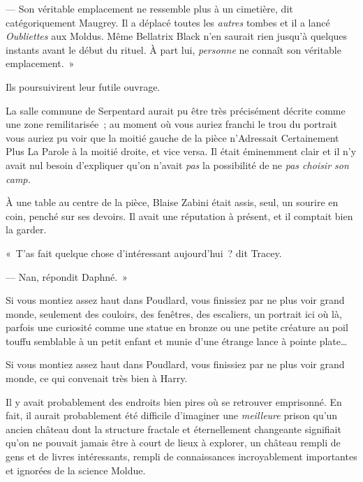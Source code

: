 --- Son véritable emplacement ne ressemble plus à un cimetière, dit catégoriquement Maugrey. Il a déplacé toutes les \emph{autres} tombes et il a lancé \emph{Oubliettes} aux Moldus. Même Bellatrix Black n'en saurait rien jusqu'à quelques instants avant le début du rituel. À part lui, \emph{personne} ne connaît son véritable emplacement.~»

Ils poursuivirent leur futile ouvrage.


La salle commune de Serpentard aurait pu être très précisément décrite comme une zone remilitarisée~; au moment où vous auriez franchi le trou du portrait vous auriez pu voir que la moitié gauche de la pièce n'Adressait Certainement Plus La Parole à la moitié droite, et vice versa. Il était éminemment clair et il n'y avait nul besoin d'expliquer qu'on n'avait \emph{pas} la possibilité de ne \emph{pas choisir son camp.}

À une table au centre de la pièce, Blaise Zabini était assis, seul, un sourire en coin, penché sur ses devoirs. Il avait une réputation à présent, et il comptait bien la garder.




«~T'as fait quelque chose d'intéressant aujourd'hui~? dit Tracey.

--- Nan, répondit Daphné.~»


Si vous montiez assez haut dans Poudlard, vous finissiez par ne plus voir grand monde, seulement des couloirs, des fenêtres, des escaliers, un portrait ici où là, parfois une curiosité comme une statue en bronze ou une petite créature au poil touffu semblable à un petit enfant et munie d'une étrange lance à pointe plate…

Si vous montiez assez haut dans Poudlard, vous finissiez par ne plus voir grand monde, ce qui convenait très bien à Harry.

Il y avait probablement des endroits bien pires où se retrouver emprisonné. En fait, il aurait probablement été difficile d'imaginer une \emph{meilleure} prison qu'un ancien château dont la structure fractale et éternellement changeante signifiait qu'on ne pouvait jamais être à court de lieux à explorer, un château rempli de gens et de livres intéressants, rempli de connaissances incroyablement importantes et ignorées de la science Moldue.

